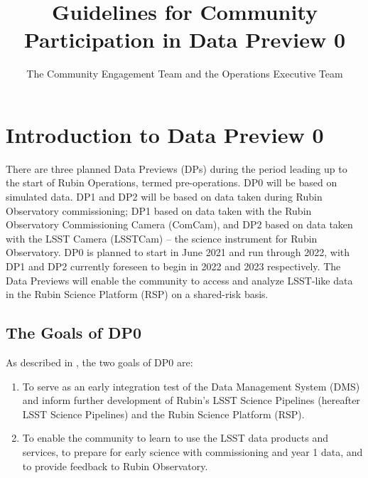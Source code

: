 \documentclass[DM,lsstdraft,authoryear,toc]{lsstdoc}
\title{Guidelines for Community Participation in Data Preview 0}
\author{The Community Engagement Team and the Operations Executive Team}
\date{\vcsDate}
\begin{document}
\maketitle

\renewcommand{\thepage}{\arabic{page}}%

\setcounter{page}{1}%


\section{Introduction to Data Preview 0}\label{sec:intro}

There are three planned Data Previews (DPs) during the period leading up to the start of Rubin Operations, termed pre-operations.
DP0 will be based on simulated data.
DP1 and DP2 will be based on data taken during Rubin Observatory commissioning; DP1 based on data taken with the Rubin Observatory Commissioning Camera (ComCam), and DP2 based on data taken with the LSST Camera (LSSTCam) -- the science instrument for Rubin Observatory.
DP0 is planned to start in June 2021 and run through 2022, with DP1 and DP2 currently foreseen to begin in 2022 and 2023 respectively.
The Data Previews will enable the community to access and analyze LSST-like data in the Rubin Science Platform (RSP) on a shared-risk basis. 

\subsection{The Goals of DP0}\label{ssec:intro_goals}

As described in , the two goals of DP0 are:
\begin{enumerate}
\item To serve as an early integration test of the Data Management System (DMS) and inform further development of Rubin's LSST Science Pipelines (hereafter LSST Science Pipelines) and the Rubin Science Platform (RSP).
\item To enable the community to learn to use the LSST data products and services, to prepare for early science with commissioning and year 1 data, and to provide feedback to Rubin Observatory. 
\end{enumerate}
\end{document}
